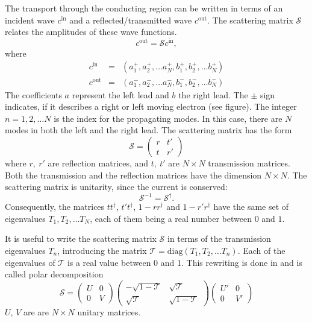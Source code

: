 The transport through the conducting region can be written in terms of an incident wave $c^\text{in}$ and a reflected/transmitted wave $c^\text{out}$. The scattering matrix $\mathcal{S}$ relates the amplitudes of these wave functions.
\begin{equation}
c^{\text{out}} = \mathcal{S} c^{\text{in}},
\end{equation}
where
\begin{eqnarray}
c^\text{in} &=& \left( a_1^+, a_2^+, \dots a_N^+, b_1^+, b_2^+, \dots b_N^+ \right) \\
c^\text{out} &=& \left( a_1^-, a_2^-, \dots a_N^-, b_1^-, b_2^-, \dots b_N^- \right)
\end{eqnarray}
The coefficients $a$ represent the left lead and $b$ the right lead. The $\pm$ sign indicates, if it describes a right or left moving electron (see figure). The integer $n = 1, 2, \dots N$ is the index for the propagating modes. In this case, there are $N$ modes in both the left and the right lead. %
The scattering matrix has the form
\begin{equation}
\mathcal{S} = \begin{pmatrix} r & t' \\ t & r'\end{pmatrix}
\end{equation}
where $r,\ r'$ are reflection matrices, and $t,\ t'$ are $N \times N $ transmission matrices. Both the transmission and the reflection matrices have the dimension $N \times N$. The scattering matrix is unitarity, since the current is conserved:
\begin{equation}
\mathcal{S}^{-1} = \mathcal{S}^\dagger.
\end{equation}
Consequently, the matrices $tt^\dagger$, $t't^\dagger$, $1-rr^\dagger$ and $1-r'r^\dagger$ have the same set of eigenvalues $T_1, T_2, \dots T_N$, each of them being a real number between $0$ and $1$.

It is useful to write the scattering matrix $\mathcal{S}$ in terms of the transmission eigenvalues $T_n$, introducing the matrix $\mathcal{T} = \text{diag} ( T_1, T_2, \dots T_n )$. Each of the eigenvalues of $\mathcal{T}$ is a real value between 0 and 1. This rewriting is done in \cite{Mello1988} and is called polar decomposition
\begin{equation}
\mathcal{S} = \begin{pmatrix} U & 0 \\ 0 & V\end{pmatrix} \begin{pmatrix} - \sqrt{1 - \mathcal{T}} & \sqrt{\mathcal{T}} \\ \sqrt{\mathcal{T}}& \sqrt{1 - \mathcal{T}} \end{pmatrix} \begin{pmatrix} U' & 0 \\ 0 & V' \end{pmatrix}
\end{equation}
$U$, $V$ are are $N\times N $ unitary matrices.

